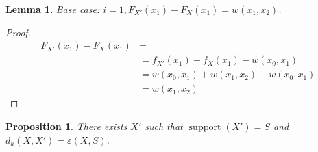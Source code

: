 \documentclass{article}
\newtheorem{lemma}[thm]{Lemma}
\newtheorem{proposition}[thm]{Proposition}
\DeclareMathOperator{\support}{support}
\begin{document}
\begin{lemma}
	Base case: $i = 1, F_{X'}(x_{1})-F_{X}(x_{1}) = w(x_{1}, x_{2})$.
\end{lemma}
\begin{proof}
	\begin{align*}
	F_{X'}(x_{1})-F_{X}(x_{1}) &= \\
	& = f_{X'}(x_{1}) - f_{X}(x_{1}) - w(x_0, x_1)  \\
	& = w(x_{0},x_1) + w(x_1,x_{2}) - w(x_0, x_1)  \\
	& = w(x_1,x_{2})
	\end{align*}
\end{proof}




\begin{proposition}
	There exists $X'$ such that $\support(X')=S$ and $d_k(X,X') = \varepsilon(X,S)$.
\end{proposition}
%	
\end{document}
